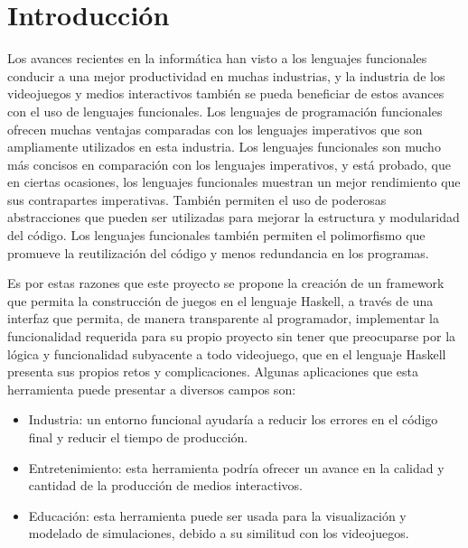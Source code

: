 \chapter{Introducción}
\label{capitulo1}

Los avances recientes en la informática han visto a los lenguajes funcionales conducir a una mejor productividad en muchas industrias, y la industria de los videojuegos y medios interactivos también se pueda beneficiar de estos avances con el uso de lenguajes funcionales. Los lenguajes de programación funcionales ofrecen muchas ventajas comparadas con los lenguajes imperativos que son ampliamente utilizados en esta industria. Los lenguajes funcionales son mucho más concisos en comparación con los lenguajes imperativos, y está probado, que en ciertas ocasiones, los lenguajes funcionales muestran un mejor rendimiento que sus contrapartes imperativas. También permiten el uso de poderosas abstracciones que pueden ser utilizadas para mejorar la estructura y modularidad del código. Los lenguajes funcionales también permiten el polimorfismo que promueve la reutilización del código y menos redundancia en los programas.

Es por estas razones que este proyecto se propone la creación de un framework que permita la construcción de juegos en el lenguaje Haskell, a través de una interfaz que permita, de manera transparente al programador, implementar la funcionalidad requerida para su propio proyecto sin tener que preocuparse por la lógica y funcionalidad subyacente a todo videojuego, que en el lenguaje Haskell presenta sus propios retos y complicaciones. Algunas aplicaciones que esta herramienta puede presentar a diversos campos son:

\begin{itemize}
\item Industria: un entorno funcional ayudaría a reducir los errores en el código final y reducir el tiempo de producción.
\item Entretenimiento: esta herramienta podría ofrecer un avance en la calidad y cantidad de la producción de medios interactivos.
\item Educación: esta herramienta puede ser usada para la visualización y modelado de simulaciones, debido a su similitud con los videojuegos.
\end{itemize}

